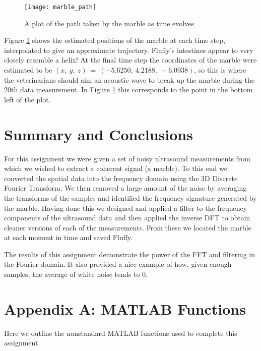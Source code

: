 \documentclass[fleqn,10pt]{SelfArx} %
\begin{document}
\begin{figure}
\centering
\texttt{[image: marble\_path]}
\caption{A plot of the path taken by the marble as time evolves}
\label{fig:marble_path}
\end{figure}

Figure \ref{fig:marble_path} shows the estimated positions of the marble at each time step, interpolated to give an approximate trajectory. Fluffy's intestines appear to very closely resemble a helix! At the final time step the coordinates of the marble were estimated to be $(x,~y,~z)~=~(-5.6250,~ 4.2188,~ -6.0938)$, so this is where the veterinarians should aim an acoustic wave to break up the marble during the 20th data measurement. In Figure \ref{fig:marble_path} this corresponds to the point in the bottom left of the plot.




\section{Summary and Conclusions} %
\label{sec:summary_and_conclusions}
For this assignment we were given a set of noisy ultrasound measurements from which we wished to extract a coherent signal (a marble). To this end we converted the spatial data into the frequency domain using the 3D Discrete Fourier Transform. We then removed a large amount of the noise by averaging the transforms of the samples and identified the frequency signature generated by the marble. Having done this we designed and applied a filter to the frequency components of the ultrasound data and then applied the inverse DFT to obtain cleaner versions of each of the measurements. From these we located the marble at each moment in time and saved Fluffy.

The results of this assignment demonstrate the power of the FFT and filtering in the Fourier domain. It also provided a nice example of how, given enough samples, the average of white noise tends to 0.





\section*{Appendix A: MATLAB Functions} %
Here we outline the nonstandard MATLAB functions used to complete this assignment.
\vskip 0.5cm
\end{document}
